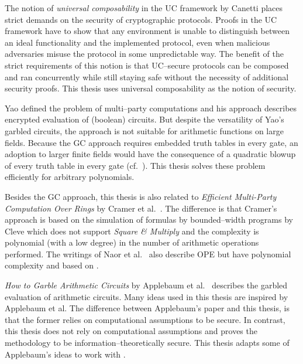 %
%
\label{sec:related-work}

The notion of \emph{universal composability} in the UC framework by Canetti
\cite{canetti05} places strict demands on the security of cryptographic
protocols. Proofs in the UC framework have to show that any environment is
unable to distinguish between an ideal functionality and the implemented
protocol, even when malicious adversaries misuse the protocol in some
unpredictable way. The benefit of the strict requirements of this notion is that
UC--secure protocols can be composed and ran concurrently while still staying
safe without the necessity of additional security proofs. This thesis uses
universal composability as the notion of security.

Yao defined the problem of multi--party computations and his  approach \cite{yao86} describes encrypted evaluation of (boolean)
circuits. But despite the versatility of Yao's garbled circuits, the approach is
not suitable for arithmetic functions on large fields. Because the GC approach
requires embedded truth tables in every gate, an adoption to larger finite
fields would have the consequence of a quadratic blowup of every truth table in
every gate (cf.\ \cite{naor99privacy}). This thesis solves these problem
efficiently for arbitrary polynomials.

Besides the GC approach, this thesis is also related to \emph{Efficient
Multi-Party Computation Over Rings} by Cramer et al.~\cite{cramer03}. The
difference is that Cramer's approach is based on the simulation of formulas by
bounded--width programs by Cleve \cite{cleve91} which does not support
\emph{Square \& Multiply} \cite{knuth81} and the complexity is polynomial (with
a low degree) in the number of arithmetic operations performed. The writings of
Naor et al.~\cite{naor99,naor06} also describe OPE but have polynomial
complexity and based on  \cite{rabin81}.

\emph{How to Garble Arithmetic Circuits} by Applebaum et al.~\cite{gac2012}
describes the garbled evaluation of arithmetic circuits.  Many ideas used in
this thesis are inspired by Applebaum et al. The difference between
Applebaum's paper and this thesis, is that the former relies on computational
assumptions to be secure. In contrast, this thesis does not rely on
computational assumptions and proves the methodology to be
information--theoretically secure. This thesis adapts some of Applebaum's ideas
to work with 
\cite{davidgoliath}.

